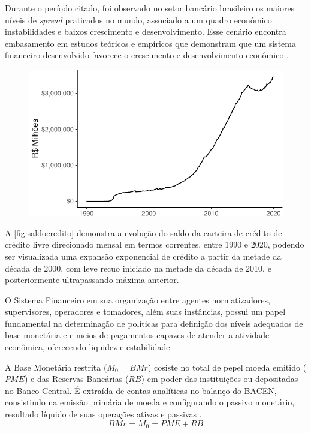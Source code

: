 \documentclass[12pt,12pt,openright,oneside,a4paper,chapter=TITLE,section=TITLE,subsection=TITLE,subsubsection=TITLE,english,french,spanish,portugues,sumario=tradicional]{abntex2}
\begin{document}
Durante o período citado, foi observado no setor bancário brasileiro os maiores
níveis de \emph{spread} praticados no mundo, associado a um quadro econômico
instabilidades e baixos crescimento e desenvolvimento. Esse cenário encontra
embasamento em estudos teóricos e empíricos que demonstram que um sistema
financeiro desenvolvido favorece o crescimento e desenvolvimento econômico
\cite{levine:1997, matos:2003}.

\begin{figure}

\begin{center}\includegraphics{12-exportedfigures/balance credit-1} \end{center}
\label{fig:saldocredito}
\end{figure}

A \autoref{fig:saldocredito} demonstra a evolução do saldo da carteira de crédito de crédito livre direcionado mensal em termos correntes, entre 1990 e 2020, podendo ser visualizada uma expansão exponencial de crédito a partir da metade da década de 2000, com leve recuo iniciado na metade da década de 2010, e posteriormente ultrapassando máxima anterior.

O Sistema Financeiro em sua organização entre agentes normatizadores, supervisores, operadores e tomadores, além suas instâncias, possui um papel fundamental na determinação de políticas para definição dos níveis adequados de base monetária e e meios de pagamentos capazes de atender a atividade econômica, oferecendo liquidez e estabilidade.

A Base Monetária restrita (\(M_0 = BMr\)) cosiste no total de pepel moeda emitido (\(PME\)) e das Reservas Bancárias (\(RB\)) em poder das instituições ou depositadas no Banco Central. É extraída de contas analíticas no balanço do BACEN, consistindo na emissão primária de moeda e configurando o passivo monetário, resultado líquido de suas operações ativas e passivas \cite{bcb:2019}.
\[
BMr = M_0 = PME + RB
\]
\end{document}
